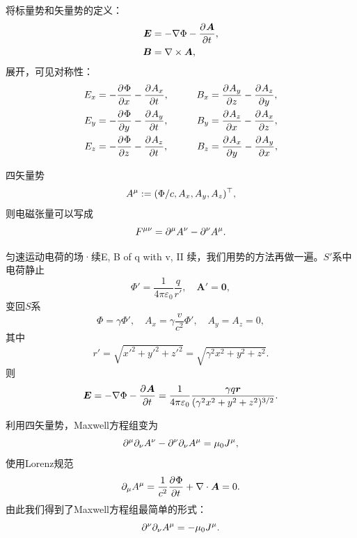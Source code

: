 将标量势和矢量势的定义：
\begin{align*}
    \bm E&=-\nabla\Phi-\frac{\partial^{{}}\bm A}{\partial{t}^{{}}},\\
    \bm B&=\nabla\times\bm A,
\end{align*}
展开，可见对称性：
\begin{alignat*}{2}
    E_x&=-\frac{\partial^{{}}\Phi}{\partial{x}^{{}}}-\frac{\partial^{{}}A_x}{\partial{t}^{{}}},&\qquad B_x&=\frac{\partial^{{}}A_y}{\partial{z}^{{}}}-\frac{\partial^{{}}A_z}{\partial{y}^{{}}},\\
    E_y&=-\frac{\partial^{{}}\Phi}{\partial{y}^{{}}}-\frac{\partial^{{}}A_y}{\partial{t}^{{}}},&B_y&=\frac{\partial^{{}}A_z}{\partial{x}^{{}}}-\frac{\partial^{{}}A_x}{\partial{z}^{{}}},\\
    E_z&=-\frac{\partial^{{}}\Phi}{\partial{z}^{{}}}-\frac{\partial^{{}}A_z}{\partial{t}^{{}}},&B_z&=\frac{\partial^{{}}A_x}{\partial{y}^{{}}}-\frac{\partial^{{}}A_y}{\partial{x}^{{}}},
\end{alignat*}

四矢量势
\begin{equation}
    A^\mu:=(\Phi/c,A_x,A_y,A_z)^\top,
\end{equation}
则电磁张量可以写成
\begin{equation}
    F^{\mu\nu}=\partial^\mu A^\nu-\partial^\nu A^\mu.
\end{equation}
\begin{example}{匀速运动电荷的场·续}{E, B of q with v, II}
    续，我们用势的方法再做一遍。$S'$系中电荷静止 
    \[
        \Phi'=\frac1{4\pi\varepsilon_0}\frac q{r'},\quad\bm A'=\bm 0,
    \]
    变回$S$系
    \[
        \Phi=\gamma\Phi',\quad A_x=\gamma\frac v{c^2}\Phi',\quad A_y=A_z=0,
    \]
    其中 
    \[
        r'=\sqrt{x'^2+y'^2+z'^2}=\sqrt{\gamma^2x^2+y^2+z^2}.
    \]
    则
    \[
        \bm E=-\nabla\Phi-\frac{\partial^{{}}\bm A}{\partial{t}^{{}}}=\frac1{4\pi\varepsilon_0}\frac{\gamma q\bm r}{(\gamma^2x^2+y^2+z^2)^{3/2}}.
    \]
\end{example}
利用四矢量势，Maxwell方程组变为
\[
    \partial^\mu\partial_\nu A^\nu-\partial^\nu\partial_\nu A^\mu=\mu_0J^\mu,
\]
使用Lorenz规范
\[
    \partial_\mu A^\mu=\frac1{c^2}\frac{\partial^{{}}\Phi}{\partial{t}^{{}}}+\nabla\cdot\bm A=0.
\]
由此我们得到了Maxwell方程组最简单的形式：
\begin{equation}
    \partial^\nu\partial_\nu A^\mu=-\mu_0J^\mu.
\end{equation}
